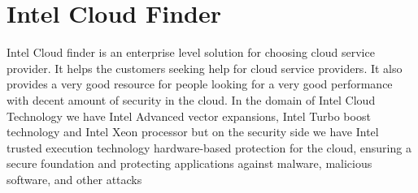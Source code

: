 \section{Intel Cloud Finder}

Intel Cloud finder is an enterprise level solution for choosing cloud service 
provider. It helps the customers seeking help for cloud service providers. It 
also provides a very good resource for people looking for a very good 
performance with decent amount of security in the cloud. In the domain of 
Intel Cloud Technology we have Intel Advanced vector expansions, Intel 
Turbo boost technology and Intel Xeon processor but on the security side we 
have Intel trusted execution technology hardware-based protection for the 
cloud, ensuring a secure foundation and protecting applications against 
malware, malicious software, and other attacks \cite{Intel}
